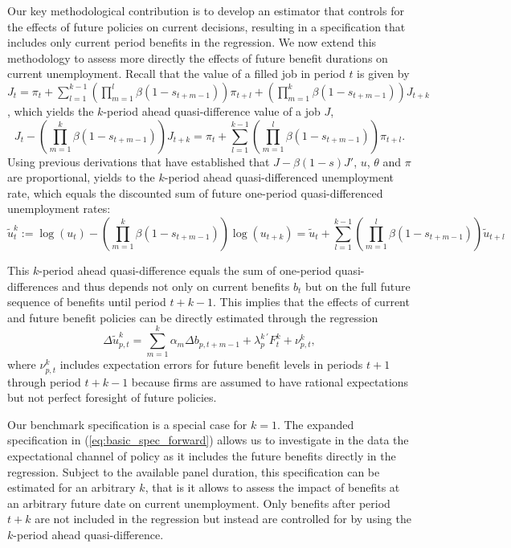 \documentclass[12pt]{article}
\newcommand{\1}{\mathbf{1}}
\begin{document}
Our key methodological contribution is to develop an estimator that controls for the effects of future policies on current decisions, resulting in a specification that includes only current period benefits in the regression. We now extend this methodology to assess more directly the effects of future benefit durations on current unemployment. Recall that the value of a filled job in period $t$ is given by $J_t = \pi_t+ \sum_{l=1}^{k-1} (\prod_{m=1}^l \beta (1-s_{t+m-1}))  \pi_{t+l}+   (\prod_{m=1}^k \beta (1-s_{t+m-1})) J_{t+k}$, which yields the $k$-period ahead quasi-difference value of a job $J$,
\begin{equation}
J_t - (\prod_{m=1}^k \beta (1-s_{t+m-1})) J_{t+k} = \pi_t + \sum_{l=1}^{k-1} (\prod_{m=1}^l \beta (1-s_{t+m-1}))  \pi_{t+l}.
\end{equation}
Using previous derivations that have established that 
$J -\beta (1-s) J'$, $u$, $\theta$ and $\pi$ are proportional, yields to the $k$-period ahead quasi-differenced unemployment rate, which equals the discounted sum of future one-period quasi-differenced unemployment rates:
\begin{equation}
\tilde{u}^k_{t} := \log(u_t) - (\prod_{m=1}^k \beta (1-s_{t+m-1}))  \log(u_{t+k}) = \tilde{u}_t+\sum_{l=1}^{k-1} (\prod_{m=1}^l \beta (1-s_{t+m-1}))  \tilde{u}_{t+l}
\end{equation}




This $k$-period ahead quasi-difference equals the sum of one-period quasi-differences and thus depends not only on current benefits $b_t$ but on the full future sequence of benefits until period $t+k-1$. This implies that the effects of current and future benefit policies can be directly estimated through the regression
\begin{equation}\label{eq:basic_spec_forward}
\Delta \tilde{u}^k_{p,t} = \sum_{m=1}^k \alpha_m \Delta b_{p,t+m-1} +\lambda_{p}^{k\, '} F^{k}_{t}+ \nu^{k}_{p,t},
\end{equation}
where $\nu^{k}_{p,t}$ includes expectation errors for future benefit levels in periods $t+1$ through period $t+k-1$ because firms are assumed to have rational expectations but not perfect foresight of future policies.

Our benchmark specification is a special case for $k=1$. The expanded specification in (\ref{eq:basic_spec_forward}) allows us to investigate in the data the expectational channel of policy as it includes the future benefits directly in the regression. Subject to the available panel duration, this specification can be estimated for an arbitrary $k$, that is it allows to assess the impact of benefits at  an arbitrary future date on current unemployment. Only benefits after period $t+k$ are not included in the regression but instead are controlled for by using the $k$-period ahead quasi-difference. 
\end{document}
